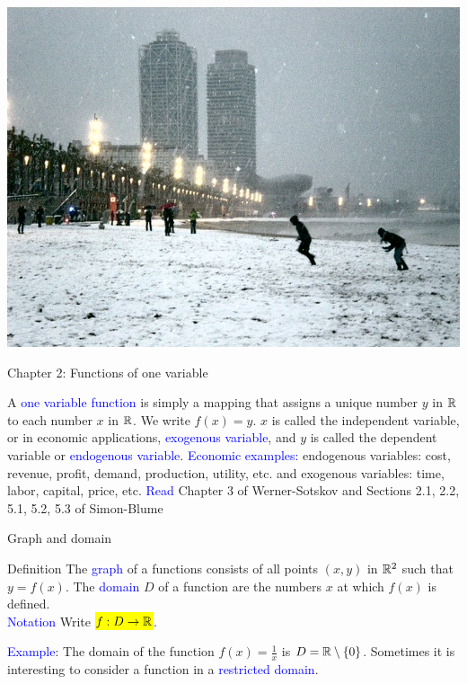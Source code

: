 \documentclass[11pt,aspectratio=169]{beamer}
\begin{document}
\begin{frame}[plain] %
  \centering\includegraphics[height=\paperheight]{vbreaks/vb2.jpg}
\end{frame}





\begin{frame}{Chapter 2: Functions of one variable}



A \textcolor{blue}{one variable function} is simply a mapping that assigns a unique number $y$ in $\mathbb R$ to each number $x$ in $\mathbb R$. We write $f(x)=y$. 
\vskip 12pt
$x$ is called the independent variable, or in economic applications, \textcolor{blue}{exogenous variable}, and $y$ is called the dependent variable or \textcolor{blue}{endogenous variable}.
\vskip 12pt
\textcolor{blue}{Economic examples:} endogenous variables: cost, revenue, profit, demand, production, utility, etc. and exogenous variables: time, labor, capital, price, etc.
\vskip 12pt
\textcolor{blue}{Read} Chapter 3 of Werner-Sotskov and Sections 2.1, 2.2, 5.1, 5.2, 5.3 of Simon-Blume\end{frame}

\begin{frame}{Graph and domain}

\begin{block}{Definition}
The \textcolor{blue}{graph} of a functions consists of all points $(x,y)$ in $\mathbb R^2$ such that $y=f(x)$.
\vskip 12pt
The \textcolor{blue}{domain} $D$ of a function are the numbers $x$ at which $f(x)$ is defined. \\[5mm]\textcolor{blue}{Notation} Write \hl{$f:D \rightarrow \mathbb R$}.	
\end{block}
\bigskip

\textcolor{blue}{Example}: The domain of the function $f(x)=\frac{1}{x}$ is $D=\mathbb R \setminus \{0\}$. 
\vskip 12pt
Sometimes it is interesting to consider a function in a \textcolor{blue}{restricted domain}.\end{frame}
\end{document}
